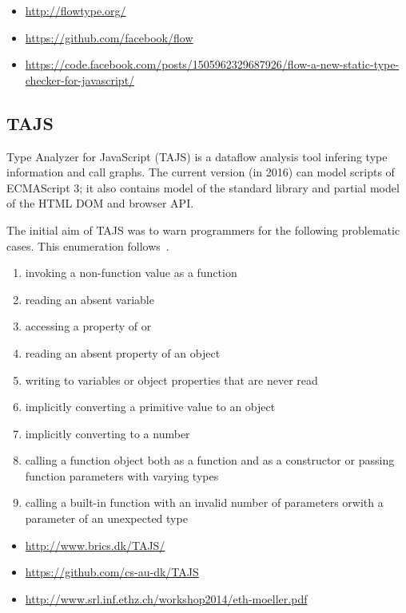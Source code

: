 
\begin{itemize}
\item \url{http://flowtype.org/}
\item \url{https://github.com/facebook/flow}
\item \url{https://code.facebook.com/posts/1505962329687926/flow-a-new-static-type-checker-for-javascript/}
\end{itemize}


\subsection{TAJS}
Type Analyzer for JavaScript (TAJS) is a dataflow analysis tool infering type information and call graphs. The current version (in 2016) can model scripts of ECMAScript 3; it also contains model of the standard library and partial model of the HTML DOM and browser API.~\cite{tajs-git}

The initial aim of TAJS was to warn programmers for the following problematic cases. This enumeration follows~\cite{jensen_type_2009}.

\begin{enumerate}
  \item invoking a non-function value as a function
  \item reading an absent variable
  \item accessing a property of  or 
  \item reading an absent property of an object
  \item writing to variables or object properties that are never read
  \item implicitly converting a primitive value to an object
  \item implicitly converting  to a number
  \item calling a function object both as a function and as a constructor or passing function parameters with varying types
  \item calling a built-in function with an invalid number of parameters orwith a parameter of an unexpected type
\end{enumerate}

\begin{itemize}
 \item \url{http://www.brics.dk/TAJS/}
 \item \url{https://github.com/cs-au-dk/TAJS}
 \item \url{http://www.srl.inf.ethz.ch/workshop2014/eth-moeller.pdf}
\end{itemize}

